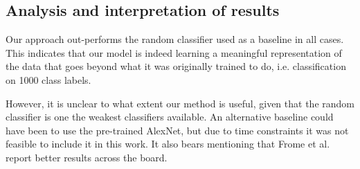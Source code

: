\documentclass[a4paper]{standalone}
\begin{document}
\subsection{Analysis and interpretation of results}

Our approach out-performs the random classifier used as a baseline in all cases. This indicates that our model is indeed learning a meaningful representation of the data that goes beyond what it was originally trained to do, i.e. classification on 1000 class labels.

However, it is unclear to what extent our method is useful, given that the random classifier is one the weakest classifiers available.
An alternative baseline could have been to use the pre-trained AlexNet, but due to time constraints it was not feasible to include it in this work. It also bears mentioning that Frome et al. report better results across the board.
\end{document}
